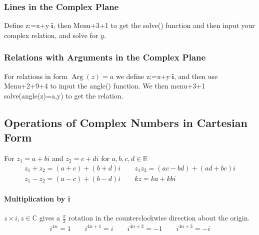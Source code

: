 \documentclass[a4paper,twoside]{article}
\DeclareMathOperator\Arg{Arg}
\begin{document}
			\subsubsection{Lines in the Complex Plane} Define z:=x+y$\cdot\mathbf{i}$, then Menu+3+1 to get the solve() function and then input your complex relation, and solve for $y$.
			
			\subsubsection{Relations with Arguments in the Complex Plane} For relations in form $\Arg(z)=a$ we define z:=x+y$\cdot\mathbf{i}$, and then use Menu+2+9+4 to input the angle() function. We then menu+3+1 solve(angle(z)=a,y) to get the relation.
		\subsection{Operations of Complex Numbers in Cartesian Form}
			For $z_1=a+bi$ and $z_2=c+di$ for $a,b,c,d\in\mathbb{R}$
			\begin{align*}
				z_1+z_2=(a+c)+(b+d)i \qquad z_1z_2=(ac-bd)+(ad+bc)i \\
				z_1-z_2=(a-c)+(b-d)i \qquad kz=ka+kbi
			\end{align*}
			\begin{minipage}{0.5\textwidth}
				\paragraph{Multiplication by i} $z\times i,z\in\mathbb{C}$ gives a $\frac{\pi}{2}$ rotation in the counterclockwise direction about the origin.
				\begin{align*}
					i^{4n}=1 \qquad i^{4n+1}=i \qquad i^{4n+2}=-1 \qquad i^{4n+3}=-i
				\end{align*}
			\end{minipage}
\end{document}
